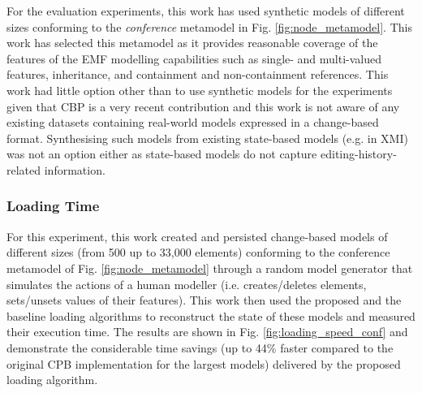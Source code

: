\documentclass[12pt, a4paper]{report} \usepackage[titletoc]{appendix}
\begin{document}
For the evaluation experiments, this work has used synthetic models of different sizes conforming to the \emph{conference} metamodel in Fig. \ref{fig:node_metamodel}. This work has selected this metamodel as it provides reasonable coverage of the features of the EMF modelling capabilities such as single- and multi-valued features, inheritance, and containment and non-containment references. This work had little option other than to use synthetic models for the experiments given that CBP is a very recent contribution and this work is not aware of any existing datasets containing real-world models expressed in a change-based format. Synthesising such models from existing state-based models (e.g. in XMI) was not an option either as state-based models do not capture editing-history-related information.    

\subsubsection{Loading Time}
\label{subsec:loading_time_test}

For this experiment, this work created and persisted change-based models of different sizes (from 500 up to 33,000 elements) conforming to the conference metamodel of Fig. \ref{fig:node_metamodel} through a random model generator that simulates the actions of a human modeller (i.e. creates/deletes elements, sets/unsets values of their features). This work then used the proposed and the baseline loading algorithms to reconstruct the state of these models and measured their execution time. The results are shown in Fig. \ref{fig:loading_speed_conf} and demonstrate the considerable time savings (up to 44\% faster compared to the original CPB implementation for the largest models) delivered by the proposed loading algorithm.
\end{document}
